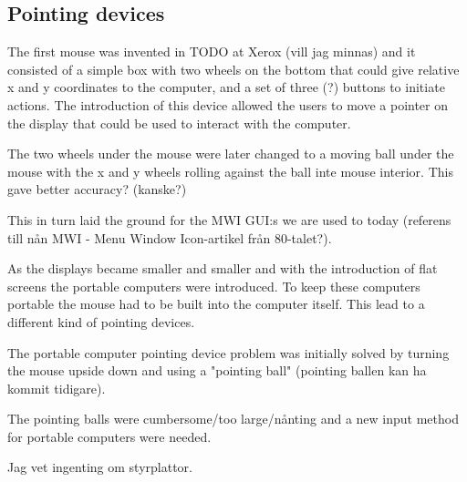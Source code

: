 \subsection{Pointing devices}

The first mouse was invented in TODO at Xerox (vill jag minnas) and it consisted of a simple box with two wheels on the bottom that could give relative x and y coordinates to the computer, and a set of three (?) buttons to initiate actions.
The introduction of this device allowed the users to move a pointer on the display that could be used to interact with the computer. 

The two wheels under the mouse were later changed to a moving ball under the mouse with the x and y wheels rolling against the ball inte mouse interior. This gave better accuracy? (kanske?)

This in turn laid the ground for the MWI GUI:s we are used to today (referens till nån MWI - Menu Window Icon-artikel från 80-talet?).

As the displays became smaller and smaller and with the introduction of flat screens the portable computers were introduced. To keep these computers portable the mouse had to be built into the computer itself. This lead to a different kind of pointing devices.

The portable computer pointing device problem was initially solved by turning the mouse upside down and using a "pointing ball" (pointing ballen kan ha kommit tidigare).

The pointing balls were cumbersome/too large/nånting and a new input method for portable computers were needed. 

Jag vet ingenting om styrplattor. 


